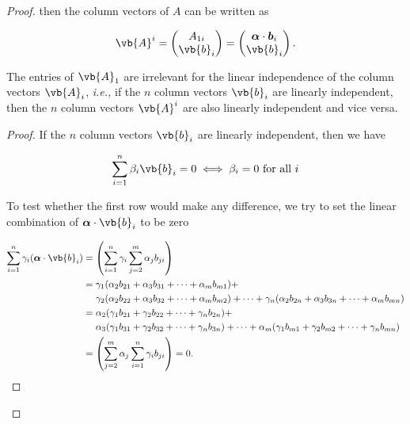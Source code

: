 \documentclass[a4paper,12pt]{report}
\begin{document}
\begin{appendices}
\begin{proof}
    then the column vectors of \(A\) can be written as 
    
    \begin{equation}
        \vb{A} ^{i} = \begin{pmatrix}
             A_{1i}  \\
            \vb{b} _{i}   \\
        \end{pmatrix} = \begin{pmatrix}
             \boldsymbol{\alpha } \cdot \boldsymbol{b}_{i}    \\
             \vb{b} _{i}  \\
        \end{pmatrix}.
    \end{equation}

    \begin{lemma}
    The entries of \(\vb{A} _{1} \) are irrelevant for the linear independence of the column vectors \(\vb{A} _{i} \), \textit{i.e.,} if the \(n\) column vectors \(\vb{b} _{i} \) are linearly independent, then the \(n\) column vectors \(\vb{A} ^{i} \) are also linearly independent and vice versa.   
    \end{lemma}
    
    \begin{proof}
        If the \(n\) column vectors \(\vb{b} _{i} \) are linearly independent, then we have
        
        \begin{equation}
        \sum_{i=1}^{n} \beta _{i}\vb{b} _{i} = 0 \iff \beta _{i} = 0 \text{ for all } i
        \end{equation}
        
        To test whether the first row would make any difference, we try to set the linear combination of \(\boldsymbol{\alpha }\cdot \vb{b} _{i}  \) to be zero
    
        \begin{equation}
            \begin{aligned}
            \sum_{i=1}^{n} \gamma _{i} (\boldsymbol{\alpha }\cdot \vb{b} _{i}) &= \left( \sum_{i=1}^{n} \gamma _{i} \sum_{j=2}^{m}\alpha _{j}b_{ji} \right) \\
            &= \gamma _{1}(\alpha _{2}b_{21} + \alpha _{3}b_{31} + \cdots + \alpha _{m} b_{m1}) +\\ &~~~~\gamma _{2} (\alpha _{2}b_{22} + \alpha _{3}b_{32} + \cdots + \alpha _{m} b_{m2 }) + \cdots + \gamma _{n} (\alpha _{2}b_{2n} + \alpha _{3}b_{3n} + \cdots + \alpha _{m} b_{mn}) \\ 
            &= \alpha _{2}(\gamma _{1} b_{21} + \gamma _{2} b_{22} + \cdots + \gamma _{n} b_{2n} ) +\\ &~~~~ \alpha _{3} (\gamma _{1} b_{31} + \gamma _{2} b_{32} + \cdots + \gamma _{n} b_{3n}  )  + \cdots + \alpha _{m}(\gamma _{1} b_{m1} + \gamma _{2} b_{m2} + \cdots + \gamma _{n} b_{mn} ) \\
            &= \left( \sum_{j=2}^{m} \alpha _{j}  \sum_{i=1}^{n} \gamma _{i} b_{ji} \right)  = 0.
            \end{aligned}
    \end{equation}
    

\end{proof}
\end{proof}
\end{appendices}
\end{document}
